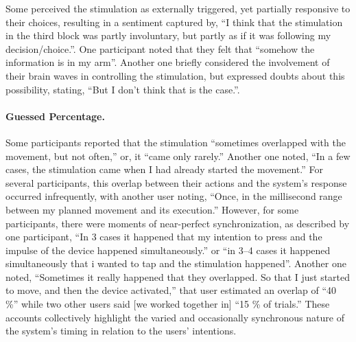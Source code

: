 Some perceived the stimulation as externally triggered, yet partially responsive to their choices, resulting in a sentiment captured by, ``I think that the stimulation in the third block was partly involuntary, but partly as if it was following my decision/choice.''. One participant noted that they felt that ``somehow the information is in my arm''. Another one briefly considered the involvement of their brain waves in controlling the stimulation, but expressed doubts about this possibility, stating, ``But I don't think that is the case.''.

\paragraph{Guessed Percentage.} 
Some participants reported that the stimulation ``sometimes overlapped with the movement, but not often,'' or, it ``came only rarely.'' Another one noted, ``In a few cases, the stimulation came when I had already started the movement.'' For several participants, this overlap between their actions and the system's response occurred infrequently, with another user noting, ``Once, in the millisecond range between my planned movement and its execution.'' However, for some participants, there were moments of near-perfect synchronization, as described by one participant, ``In 3 cases it happened that my intention to press and the impulse of the device happened simultaneously.'' or ``in 3--4 cases it happened simultaneously that i wanted to tap and the stimulation happened''. Another one noted, ``Sometimes it really happened that they overlapped. So that I just started to move, and then the device activated,'' that user estimated an overlap of ``40 \%'' while two other users said [we worked together in] ``15 \% of trials.'' These accounts collectively highlight the varied and occasionally synchronous nature of the system's timing in relation to the users' intentions.

